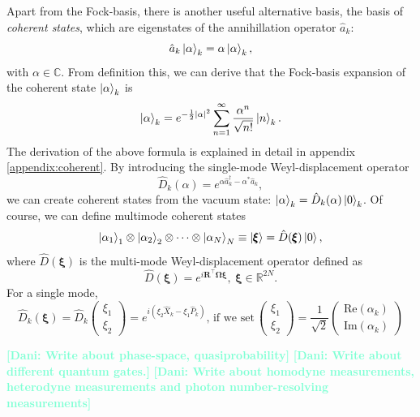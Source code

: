 \documentclass[12pt, a4paper,  nobibnotes]{article}
\newcommand{\op}[1]{\hat{#1}}
\newcommand{\nd}[1]{\textcolor{Aquamarine}{\textbf{[Dani: #1]}}}
\begin{document}
Apart from the Fock-basis, there is another useful alternative basis, the basis of \textit{coherent states},
which are eigenstates of the annihillation operator $\op a_k$:
\begin{equation}
    \op a_k \ket{\alpha}_k = \alpha\ket{\alpha}_k,
\end{equation}
with $\alpha\in\mathbb C$. From definition this, we can derive that the Fock-basis expansion of 
the coherent state $\ket\alpha_k$ is
\begin{equation}
    \ket\alpha_k = e^{-\frac{1}{2}|\alpha|^2}\sum\limits_{n=1}^\infty \frac{\alpha^n}{\sqrt{n!}}\ket n_k.
\end{equation}
The derivation of the above formula is explained in detail in appendix \ref{appendix:coherent}. By introducing 
the single-mode Weyl-displacement operator 
\begin{equation}
    \op D_k(\alpha) = e^{\alpha\op a^\dagger_k - \alpha^*\op a_k},
\end{equation}
we can create coherent states from the vacuum state: $\ket\alpha_k = \op D_k(\alpha)\ket 0_k$. Of 
course, we can define multimode coherent states 
\begin{equation}
    \ket{\alpha_1}_1 \otimes \ket{\alpha_2}_2 \otimes \cdots \otimes \ket{\alpha_N}_N \equiv \ket{\pmb\xi} = \op D(\pmb\xi) \ket 0,
\end{equation}
where $\op D(\pmb\xi)$ is the multi-mode Weyl-displacement operator defined as
\begin{equation}
    \op D(\pmb\xi) = e^{i\mathbf R^\top\pmb\Omega\pmb\xi}, ~ \pmb\xi \in \mathbb R^{2N}.
\end{equation}
For a single mode, 
\begin{equation}
    \op D_k(\pmb\xi) = \op D_k\left(\begin{matrix}
        \xi_1 \\ \xi_2
    \end{matrix}\right)
    = e^{i(\xi_2 \op X_k - \xi_1 \op P_k)},\,\textrm{if we set}\,\left(\begin{matrix}
        \xi_1 \\ \xi_2
    \end{matrix}\right) = \frac{1}{\sqrt 2}\left(\begin{matrix}
        \textrm{Re}(\alpha_k) \\ \textrm{Im}(\alpha_k)
    \end{matrix}\right)
\end{equation}

\nd{Write about phase-space, quasiprobability}
\nd{Write about different quantum gates.}
\nd{Write about homodyne measurements, heterodyne measurements and photon number-resolving measurements}
\end{document}
